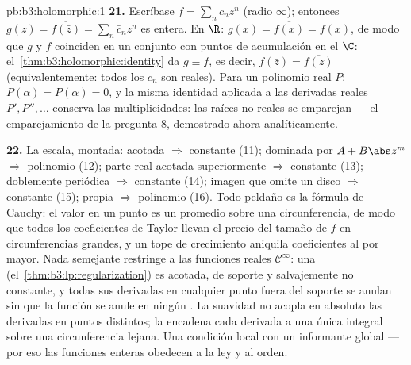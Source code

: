 \begin{solution}{pb:b3:holomorphic:1}
\textbf{21.} Escríbase $f = \sum_nc_nz^n$ (radio $\infty$); entonces
$g(z) = \overline{f(\bar z)} = \sum_n\bar c_nz^n$ es entera. En $\R$:
$g(x) = \overline{f(x)} = f(x)$, de modo que $g$ y $f$ coinciden en un
conjunto con puntos de acumulación en el
 $\C$:
el~\cref{thm:b3:holomorphic:identity} da $g \equiv f$, es decir,
$f(\bar z) = \overline{f(z)}$ (equivalentemente: todos los $c_n$ son
reales). Para un polinomio real $P$:
$P(\bar\alpha) = \overline{P(\alpha)} = 0$, y la misma identidad
aplicada a las derivadas reales $P', P'', \dots$ conserva las
multiplicidades: las raíces no reales se emparejan --- el emparejamiento
de la pregunta 8, demostrado ahora analíticamente.

\textbf{22.} La escala, montada: acotada $\Rightarrow$ constante (11);
dominada por $A + B\abs z^m$ $\Rightarrow$ polinomio (12); parte real
acotada superiormente $\Rightarrow$ constante (13); doblemente periódica
$\Rightarrow$ constante (14); imagen que omite un disco $\Rightarrow$
constante (15); propia $\Rightarrow$ polinomio (16). Todo peldaño es la
fórmula de Cauchy: el valor en un punto es un promedio sobre una
circunferencia, de modo que todos los coeficientes de Taylor llevan el
precio del tamaño de $f$ en circunferencias grandes, y un tope de
crecimiento aniquila coeficientes al por mayor. Nada semejante restringe
a las funciones reales $\mathcal
C^\infty$: una 
(el~\cref{thm:b3:lp:regularization}) es acotada, de soporte  y
salvajemente no constante, y todas sus derivadas en cualquier punto
fuera del soporte se anulan sin que la función se anule en ningún
. La suavidad no acopla en absoluto las derivadas en puntos
distintos; la  encadena cada
derivada a una única integral sobre una circunferencia lejana. Una
condición local con un informante global --- por eso las funciones
enteras obedecen a la ley y al orden.


\end{solution}
